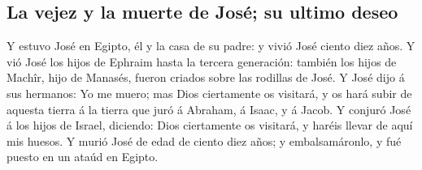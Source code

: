 \hypertarget{la-vejez-y-la-muerte-de-josuxe9-su-ultimo-deseo}{%
\subsection{La vejez y la muerte de José; su ultimo
deseo}\label{la-vejez-y-la-muerte-de-josuxe9-su-ultimo-deseo}}

 Y estuvo José en Egipto, él y la casa de su padre: y
vivió José ciento diez años.  Y vió José los hijos de
Ephraim hasta la tercera generación: también los hijos de Machîr, hijo
de Manasés, fueron criados sobre las rodillas de José.  Y
José dijo á sus hermanos: Yo me muero; mas Dios ciertamente os visitará,
y os hará subir de aquesta tierra á la tierra que juró á Abraham, á
Isaac, y á Jacob.  Y conjuró José á los hijos de Israel,
diciendo: Dios ciertamente os visitará, y haréis llevar de aquí mis
huesos.  Y murió José de edad de ciento diez años; y
embalsamáronlo, y fué puesto en un ataúd en Egipto.
